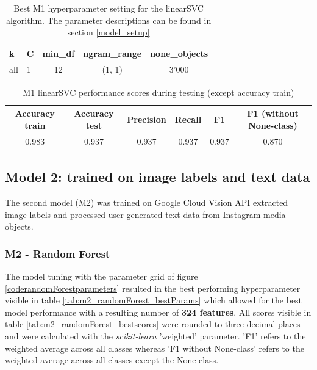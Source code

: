 \begin{table}[h!]
\begin{center}
\caption{Best M1 hyperparameter setting for the linearSVC algorithm. The parameter descriptions can be found in section \ref{model_setup}}\vspace{1ex}
\label{tab:m1_linearSVC_bestParams}
\begin{tabular}{llccc}\hline
k & C & min\_df & ngram\_range & none\_objects \\ \hline
all & 1 & 12 & (1, 1) & 3'000 \\ \hline
\end{tabular}
\end{center}
\end{table}

\begin{table}[h!]
\begin{center}
\caption{M1 linearSVC performance scores during testing (except accuracy train)}\vspace{1ex}
\label{tab:m1_linearSVC_bestscores}
\begin{tabular}{cccccc}\hline
Accuracy train & Accuracy test & Precision & Recall & F1 & F1 (without None-class)\\ \hline
0.983 & 0.937 & 0.937 & 0.937 & 0.937 & 0.870 \\ \hline
\end{tabular}
\end{center}
\end{table}

\subsection{Model 2: trained on image labels and text data}
The second model (M2) was trained on Google Cloud Vision API extracted image labels and processed user-generated text data from Instagram media objects.

\subsubsection{M2 - Random Forest}
The model tuning with the parameter grid of figure \ref{coderandomForestparameters} resulted in the best performing hyperparameter visible in table \ref{tab:m2_randomForest_bestParams} which allowed for the best model performance with a resulting number of \textbf{324 features}. All scores visible in table \ref{tab:m2_randomForest_bestscores} were rounded to three decimal places and were calculated with the \textit{scikit-learn} 'weighted' parameter. 'F1' refers to the weighted average across all classes whereas 'F1 without None-class' refers to the weighted average across all classes except the None-class.

